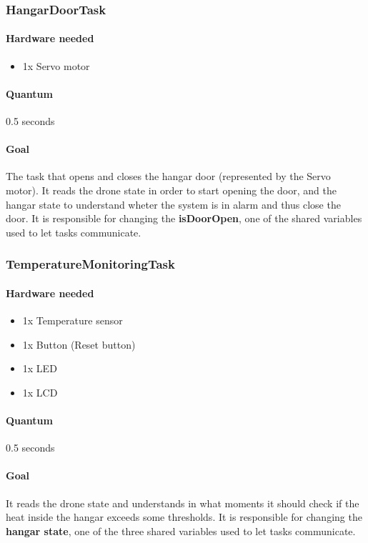 \documentclass[12pt, letterpaper, twoside]{article}
\begin{document}
\subsubsection{HangarDoorTask}
\paragraph{Hardware needed}
\begin{itemize}
    \item 1x Servo motor
\end{itemize}
\paragraph{Quantum}
0.5 seconds
\paragraph{Goal}
The task that opens and closes the hangar door (represented by the Servo motor). It reads the drone state in order to start opening the door, and the hangar state to understand wheter the system is in alarm and thus close the door. It is responsible for changing the \textbf{isDoorOpen}, one of the shared variables used to let tasks communicate.

\subsubsection{TemperatureMonitoringTask}
\paragraph{Hardware needed}
\begin{itemize}
    \item 1x Temperature sensor
    \item 1x Button (Reset button)
    \item 1x LED
    \item 1x LCD
\end{itemize}
\paragraph{Quantum}
0.5 seconds
\paragraph{Goal}
It reads the drone state and understands in what moments it should check if the heat inside the hangar exceeds some thresholds. It is responsible for changing the \textbf{hangar state}, one of the three shared variables used to let tasks communicate.
\end{document}
